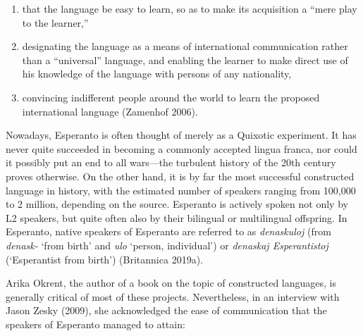 \begin{enumerate}
  \item that the language be easy to learn, so as to make its acquisition a ``mere play to the learner,''
  \item designating the language as a means of international communication rather than a ``universal'' language, and enabling the learner to make direct use of his knowledge of the language with persons of any nationality,
  \item convincing indifferent people around the world to learn the proposed international language (Zamenhof 2006).
\end{enumerate}

Nowadays, Esperanto is often thought of merely as a Quixotic experiment.
It has never quite succeeded in becoming a commonly accepted lingua franca, nor could it possibly put an end to all wars---the turbulent history of the 20th century proves otherwise.
On the other hand, it is by far the most successful constructed language in history, with the estimated number of speakers ranging from 100,000 to 2 million, depending on the source.
Esperanto is actively spoken not only by L2 speakers, but quite often also by their bilingual or multilingual offspring.
In Esperanto, native speakers of Esperanto are referred to as \textit{denaskuloj} (from \textit{denask-} `from birth' and \textit{ulo} `person, individual') or \textit{denaskaj Esperantistoj} (`Esperantist from birth')
(Britannica 2019a).

Arika Okrent, the author of a book on the topic of constructed languages, is generally critical of most of these projects.
Nevertheless, in an interview with Jason Zesky (2009), she acknowledged the ease of communication that the speakers of Esperanto managed to attain:

